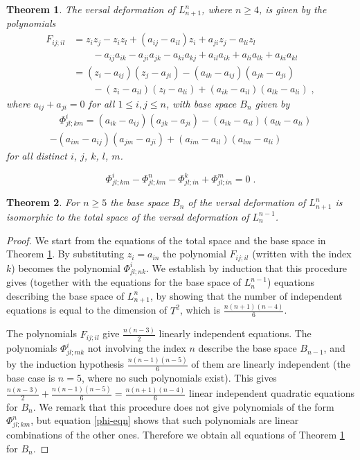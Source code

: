 \documentclass[10pt,a4paper]{amsart}
\newtheorem{thm}{Theorem}
\begin{document}
\begin{thm}\label{versal-def-thm}
The versal deformation of $L_{n+1}^n$, where $n\geq 4$, is given by the polynomials
\begin{align*}
F_{ij;il}&= z_iz_j-z_iz_l+(a_{ij}-a_{il})z_i+a_{ji}z_j-a_{li}z_l \\
&\qquad - a_{ij}a_{ik}-a_{ji}a_{jk}-a_{ki}a_{kj}+ a_{il}a_{ik}+a_{li}a_{lk}+a_{ki}a_{kl}\\
&=(z_i-a_{ij})(z_j-a_{ji})-(a_{ik}-a_{ij})(a_{jk}-a_{ji})\\
&\qquad -(z_i-a_{il})(z_l-a_{li})+(a_{ik}-a_{il})(a_{lk}-a_{li})\;,
\end{align*}
where $a_{ij}+a_{ji}=0$ for all $1\leq i,j\leq n$,
with base space $B_n$ given by 
\begin{multline*}
\quad \Phi^i_{jl;km}=(a_{ik}-a_{ij})(a_{jk}-a_{ji})-(a_{ik}-a_{il})(a_{lk}-a_{li})\\
- (a_{im}-a_{ij})(a_{jm}-a_{ji})+(a_{im}-a_{il})(a_{lm}-a_{li})\quad
\end{multline*}
for all distinct $i$, $j$, $k$, $l$, $m$.
\end{thm}  

\begin{equation}\label{phi-eqn}
\Phi^i_{jl;km}-\Phi^n_{jl;km}-\Phi^k_{jl;in}+\Phi^m_{jl;in}=0\;.
\end{equation}

\begin{thm}\label{thm:basetotal}
For $n\geq 5$ 
the base space $B_n$ of the versal deformation of $L_{n+1}^n$
is  isomorphic to 
the total space of the versal deformation of $L_{n}^{n-1}$.
\end{thm}

\begin{proof}
We start from the equations of the total space and the base space
in Theorem \ref{versal-def-thm}.
By substituting $z_i=a_{in}$ the polynomial $F_{ij;il}$ (written with the index $k$)
becomes  the polynomial $\Phi^i_{jl;nk}$. 
We establish by induction that this procedure gives (together with the equations for the base space of $L_{n}^{n-1}$) equations describing the base space of $L_{n+1}^n$,
by showing that the number of independent equations  is equal to the
dimension of $T^2$, which is $\frac{n(n+1)(n-4)}6$.

The polynomials $F_{ij;il}$  give
$\frac{n(n-3)}2$ linearly independent equations.
The polynomials  $\Phi^i_{jl;mk}$ not involving the index $n$ describe
the base space $B_{n-1}$, and  by the induction hypothesis $\frac{n(n-1)(n-5)}6$  of them are linearly independent (the base case is $n=5$, where no such polynomials exist).
This gives   $\frac{n(n-3)}2+
\frac{n(n-1)(n-5)}6= \frac{n(n+1)(n-4)}6$ linear independent quadratic
equations for $B_n$. 
We remark that this procedure does not give polynomials of the form  $\Phi^n_{jl;km}$,
but equation \eqref{phi-eqn} shows that such polynomials are linear combinations
of the other ones. Therefore we obtain all equations of  Theorem \ref{versal-def-thm}
for $B_n$.
\end{proof}
\end{document}
